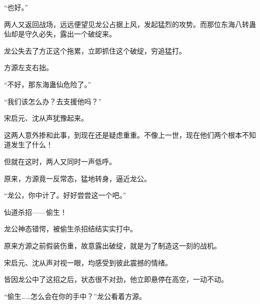 \begin{this_body}
“也好。”

两人又返回战场，远远便望见龙公占据上风，发起猛烈的攻势。而那位东海八转蛊仙却是守久必失，露出一个破绽来。

龙公失去了方正这个拖累，立即抓住这个破绽，穷追猛打。

方源左支右拙。

“不好，那东海蛊仙危险了。”

“我们该怎么办？去支援他吗？”

宋启元、沈从声犹豫起来。

这两人意外掺和此事，到现在还是疑虑重重。不像上一世，现在他们两个根本不知道发生了什么！

但就在这时，两人又同时一声低呼。

原来，方源竟一反常态，猛地转身，逼近龙公。

“龙公，你中计了。好好尝尝这一个吧。”

仙道杀招——偷生！

龙公神态错愕，被偷生杀招结结实实打中。

原来方源之前假装伤重，故意露出破绽，就是为了制造这一刻的战机。

宋启元、沈从声对视一眼，均感受到彼此震撼的情绪。

皆因龙公中了这招之后，状态很不对劲，他立即悬停在高空，一动不动。

“偷生……怎么会在你的手中？”龙公看着方源。

\end{this_body}

